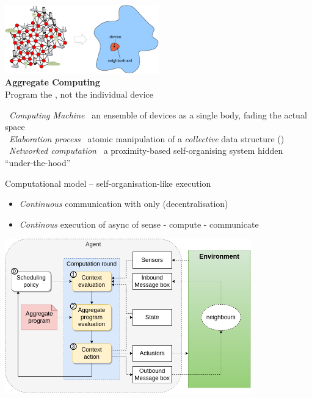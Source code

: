 \documentclass[presentation, 9pt]{beamer}\mode<presentation>{\usetheme{AMSBolognaFC}}
\begin{document}
\begin{frame}[c, plain]
\begin{center}
	\includegraphics[width=0.5\textwidth]{img/aggregate-computing-structure.png}\\
	{\Huge \textbf{Aggregate Computing}}\\
	{\large Program the , not the individual device} \\[0.2cm]
\end{center}
{\faCircle \, \normalsize{\emph{Computing Machine}} \faArrowRight \, an ensemble of devices as a single body, fading the actual space}\\
{\faCircle \, \normalsize{\emph{Elaboration process}} \faArrowRight \, atomic manipulation of a \emph{collective} data structure ()}\\
{\faCircle \, \normalsize{\emph{Networked computation}} \faArrowRight \,
a proximity-based self-organising system hidden ``under-the-hood''}
\end{frame}
\begin{frame}{Computational model -- self-organisation-like execution}
\begin{itemize}
	\item \emph{Continuous} communication with  only (\faArrowRight decentralisation)
	\item \emph{Continous} execution of async  of sense - compute - communicate
\end{itemize}
\centering
\includegraphics[width=0.8\textwidth]{img/execution-step.png}
\end{frame}
\end{document}
